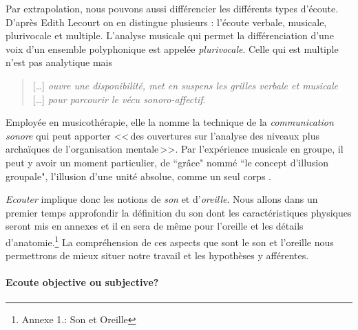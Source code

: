 Par extrapolation, nous pouvons aussi différencier les différents types d'écoute. D'après Edith Lecourt \autocite[ch. 10 <<\,De l'écoute verbale à l'écoute musicale\,>>, p. 182.]{lecourt:decouvrir}
 on en distingue plusieurs : l'écoute verbale, musicale, plurivocale et multiple.
 L'analyse musicale qui permet la différenciation d'une voix d'un ensemble polyphonique est appelée \emph{plurivocale}. Celle qui est multiple n'est pas analytique  mais
 \begin{quote}
 	 [\ldots] \textit{ouvre une disponibilité, met en suspens les grilles verbale et musicale} [\ldots] \emph{pour parcourir le vécu sonoro-affectif}\autocite[p. 183]{lecourt:decouvrir}.
 \end{quote}
 Employée en musicothérapie, elle la nomme la technique de la  \emph{communication sonore} qui peut apporter
 <<\,des ouvertures sur l'analyse des niveaux plus archaïques de l'organisation mentale\,>>\autocite[p. 154]{lecourt:decouvrir}.
 Par l'expérience musicale en groupe, il peut y avoir un moment
 particulier, de ``grâce"  nommé ``le concept d'illusion groupale",
 l'illusion d'une unité absolue, comme un seul corps \autocite{anzieu:groupal}.

\emph{Ecouter} implique donc les notions de \emph{son} et
d'\emph{oreille}. Nous allons dans un premier temps approfondir  la
définition du son dont les caractéristiques physiques seront mis en
annexes et il en sera de même pour l'oreille et les détails
d'anatomie.\footnote{Annexe 1.: Son et Oreille}
La compréhension de ces aspects que sont le son et l'oreille nous
permettrons de mieux situer notre travail et les hypothèses y afférentes.








\paragraph{Ecoute objective ou subjective?}

